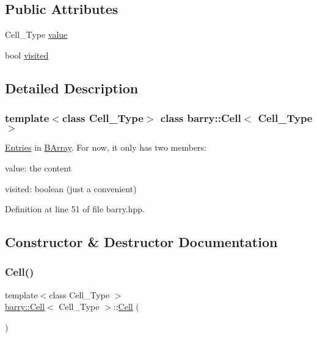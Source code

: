 \subsection*{Public Attributes}
\begin{DoxyCompactItemize}
\item 
Cell\+\_\+\+Type \hyperlink{classbarry_1_1_cell_a52918ded332c6a12109b5962d6bf3ae9}{value}
\item 
bool \hyperlink{classbarry_1_1_cell_ad7800879e5079e6b5a3982827adc38c1}{visited}
\end{DoxyCompactItemize}


\subsection{Detailed Description}
\subsubsection*{template$<$class Cell\+\_\+\+Type$>$\newline
class barry\+::\+Cell$<$ Cell\+\_\+\+Type $>$}

\hyperlink{classbarry_1_1_entries}{Entries} in \hyperlink{classbarry_1_1_b_array}{B\+Array}. For now, it only has two members\+: 


\begin{DoxyItemize}
\item value\+: the content
\item visited\+: boolean (just a convenient) 
\end{DoxyItemize}

Definition at line 51 of file barry.\+hpp.



\subsection{Constructor \& Destructor Documentation}
\mbox{\label{classbarry_1_1_cell_aa7beee933fc291cbc4ac84ec3ab63352}} 
\subsubsection{\texorpdfstring{Cell()}{Cell()}\hspace{0.1cm}{\footnotesize\ttfamily [1/5]}}
{\footnotesize\ttfamily template$<$class Cell\+\_\+\+Type $>$ \\
\hyperlink{classbarry_1_1_cell}{barry\+::\+Cell}$<$ Cell\+\_\+\+Type $>$\+::\hyperlink{classbarry_1_1_cell}{Cell} (\begin{DoxyParamCaption}{ }\end{DoxyParamCaption})}

